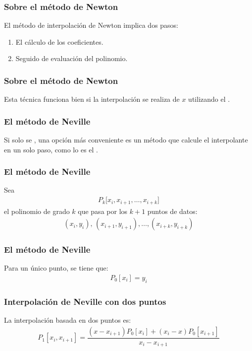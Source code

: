 \documentclass[12pt]{beamer}
\begin{document}
\begin{frame}
\frametitle{Sobre el método de Newton}
El método de interpolación de Newton implica dos pasos:
\pause
{}
\begin{enumerate}[<+->]
\item El cálculo de los coeficientes.
\item Seguido de evaluación del polinomio.
\end{enumerate}
\end{frame}
\begin{frame}
\frametitle{Sobre el método de Newton}
Esta técnica funciona bien si la interpolación se realiza  de $x$ utilizando el .
\end{frame}
\begin{frame}
\frametitle{El método de Neville}
Si solo se , una opción más conveniente es un método que calcule el interpolante en un solo paso, \pause como lo es el .
\end{frame}
\begin{frame}
\frametitle{El método de Neville}
Sea 
\begin{align*}
P_{k} \big[ x_{i} , x_{i+1}, \ldots, x_{i+k} \big]
\end{align*}
el polinomio de grado $k$ que pasa por los $k + 1$ puntos de datos:
\pause
\begin{align*}
(x_{i}, y_{i}), \, (x_{i+1}, y_{i+1}), \ldots , (x_{i+k}, y_{i+k})
\end{align*}
\end{frame}
\begin{frame}
\frametitle{El método de Neville}
Para un único punto, se tiene que:
\pause
\begin{align}
P_{0} [x_{i}] = y_{i} \label{eq:3_07}
\end{align}
\end{frame}
\begin{frame}
\frametitle{Interpolación de Neville con dos puntos}
La interpolación basada en dos puntos es:
\pause
\begin{align*}
P_{1} [x_{i}, x_{i+1}] = \dfrac{(x - x_{i+1}) P_{0} [x_{i}] + (x_{i} - x) P_{0} [x_{i+1}]}{x_{i} - x_{i+1}}
\end{align*}
\end{frame}
\end{document}
